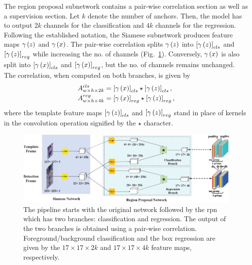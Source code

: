 The region proposal subnetwork contains a pair-wise correlation section as well as a supervision section. Let $k$ denote the number of anchors. Then, the model has to output $2k$ channels for the classification and $4k$ channels for the regression. Following the established notation, the Siamese subnetwork produces feature maps ${\gamma} \left( z \right)$ and ${\gamma} \left( x \right)$. The pair-wise correlation splits ${\gamma} \left( z \right)$ into $\left[ {{\gamma} \left( z \right)} \right]_{cls}$ and $\left[ {{\gamma} \left( z \right)} \right]_{reg}$ while increasing the no. of channels (Fig.~\ref{fig:SiamRPNNetArchitecture}). Conversely, ${\gamma} \left( x \right)$ is also split into $\left[ {{\gamma} \left( x \right)} \right]_{cls}$ and $\left[ {{\gamma} \left( x \right)} \right]_{reg}$, but the no. of channels remains unchanged. The correlation, when computed on both branches, is given by
\begin{equation}
    \begin{aligned}
        {A}_{w \times h \times 2k}^{cls} &=
        \left[ {{\gamma} \left( x \right)} \right]_{cls} \star \left[ {{\gamma} \left( z \right)} \right]_{cls},\\
        {A}_{w \times h \times 4k}^{reg} &=
        \left[ {{\gamma} \left( x \right)} \right]_{reg} \star \left[ {{\gamma} \left( z \right)} \right]_{reg},
    \end{aligned}
\end{equation}
where the template feature maps $\left[ {{\gamma} \left( z \right)} \right]_{cls}$ and $\left[ {{\gamma} \left( z \right)} \right]_{reg}$ stand in place of kernels in the convolution operation signified by the $\star$ character.

\begin{figure}[t]
    \centerline{\includegraphics[width=\linewidth]{figures/theoretical_foundations/siam_rpn_architecture.pdf}}
    \caption[ architecture]{The pipeline starts with the original  network followed by the \gls{rpn} which has two branches: classification and regression. The output of the two branches is obtained using a pair-wise correlation. Foreground/background classification and the box regression are given by the $17 \times 17 \times 2k$ and $17 \times 17 \times 4k$ feature maps, respectively. }
    \label{fig:SiamRPNNetArchitecture}
\end{figure}

